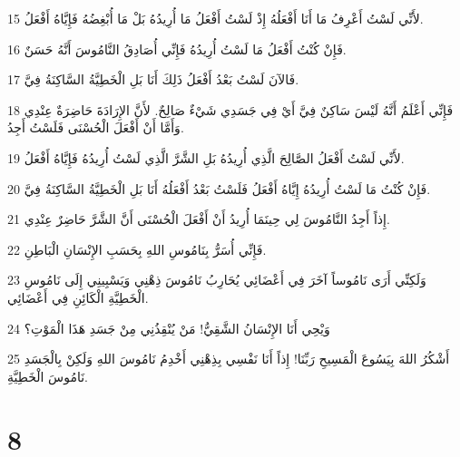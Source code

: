 \par 15 لأَنِّي لَسْتُ أَعْرِفُ مَا أَنَا أَفْعَلُهُ إِذْ لَسْتُ أَفْعَلُ مَا أُرِيدُهُ بَلْ مَا أُبْغِضُهُ فَإِيَّاهُ أَفْعَلُ.
\par 16 فَإِنْ كُنْتُ أَفْعَلُ مَا لَسْتُ أُرِيدُهُ فَإِنِّي أُصَادِقُ النَّامُوسَ أَنَّهُ حَسَنٌ.
\par 17 فَالآنَ لَسْتُ بَعْدُ أَفْعَلُ ذَلِكَ أَنَا بَلِ الْخَطِيَّةُ السَّاكِنَةُ فِيَّ.
\par 18 فَإِنِّي أَعْلَمُ أَنَّهُ لَيْسَ سَاكِنٌ فِيَّ أَيْ فِي جَسَدِي شَيْءٌ صَالِحٌ. لأَنَّ الإِرَادَةَ حَاضِرَةٌ عِنْدِي وَأَمَّا أَنْ أَفْعَلَ الْحُسْنَى فَلَسْتُ أَجِدُ.
\par 19 لأَنِّي لَسْتُ أَفْعَلُ الصَّالِحَ الَّذِي أُرِيدُهُ بَلِ الشَّرَّ الَّذِي لَسْتُ أُرِيدُهُ فَإِيَّاهُ أَفْعَلُ.
\par 20 فَإِنْ كُنْتُ مَا لَسْتُ أُرِيدُهُ إِيَّاهُ أَفْعَلُ فَلَسْتُ بَعْدُ أَفْعَلُهُ أَنَا بَلِ الْخَطِيَّةُ السَّاكِنَةُ فِيَّ.
\par 21 إِذاً أَجِدُ النَّامُوسَ لِي حِينَمَا أُرِيدُ أَنْ أَفْعَلَ الْحُسْنَى أَنَّ الشَّرَّ حَاضِرٌ عِنْدِي.
\par 22 فَإِنِّي أُسَرُّ بِنَامُوسِ اللهِ بِحَسَبِ الإِنْسَانِ الْبَاطِنِ.
\par 23 وَلَكِنِّي أَرَى نَامُوساً آخَرَ فِي أَعْضَائِي يُحَارِبُ نَامُوسَ ذِهْنِي وَيَسْبِينِي إِلَى نَامُوسِ الْخَطِيَّةِ الْكَائِنِ فِي أَعْضَائِي.
\par 24 وَيْحِي أَنَا الإِنْسَانُ الشَّقِيُّ! مَنْ يُنْقِذُنِي مِنْ جَسَدِ هَذَا الْمَوْتِ؟
\par 25 أَشْكُرُ اللهَ بِيَسُوعَ الْمَسِيحِ رَبِّنَا! إِذاً أَنَا نَفْسِي بِذِهْنِي أَخْدِمُ نَامُوسَ اللهِ وَلَكِنْ بِالْجَسَدِ نَامُوسَ الْخَطِيَّةِ.

\chapter{8}

